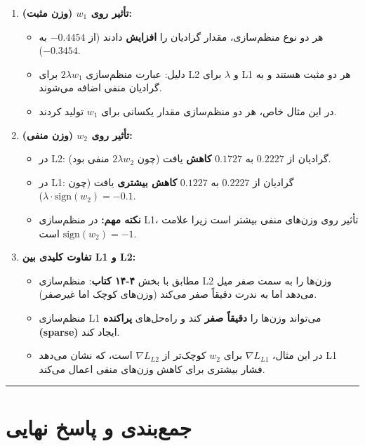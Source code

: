 \documentclass[11pt,a4paper]{article}
\newcommand{\en}[1]{\textenglish{#1}}
\newcommand{\separator}{\vspace{1em}\noindent\rule{\linewidth}{0.4pt}\vspace{1em}}
\begin{document}
\begin{enumerate}
    \item \textbf{تأثیر روی \(w_1\) (وزن مثبت):}
    \begin{itemize}
        \item هر دو نوع منظم‌سازی، مقدار گرادیان را \textbf{افزایش} دادند (از \(-0.4454\) به \(-0.3454\)).
        \item دلیل: عبارت منظم‌سازی \(2\lambda w_1\) برای \en{L2} و \(\lambda\) برای \en{L1} هر دو مثبت هستند و به گرادیان منفی اضافه می‌شوند.
        \item در این مثال خاص، هر دو منظم‌سازی مقدار یکسانی برای \(w_1\) تولید کردند.
    \end{itemize}
    
    \item \textbf{تأثیر روی \(w_2\) (وزن منفی):}
    \begin{itemize}
        \item در \en{L2}: گرادیان از \(0.2227\) به \(0.1727\) \textbf{کاهش} یافت (چون \(2\lambda w_2\) منفی بود).
        \item در \en{L1}: گرادیان از \(0.2227\) به \(0.1227\) \textbf{کاهش بیشتری} یافت (چون \(\lambda \cdot \text{sign}(w_2) = -0.1\)).
        \item \textbf{نکته مهم:} در منظم‌سازی \en{L1}، تأثیر روی وزن‌های منفی بیشتر است زیرا علامت \(\text{sign}(w_2) = -1\) است.
    \end{itemize}
    
    \item \textbf{تفاوت کلیدی بین \en{L1} و \en{L2}:}
    \begin{itemize}
        \item مطابق با بخش \textbf{\en{۴-۱۴} کتاب}: منظم‌سازی \en{L2} وزن‌ها را به سمت صفر میل می‌دهد اما به ندرت دقیقاً صفر می‌کند (وزن‌های کوچک اما غیرصفر).
        \item منظم‌سازی \en{L1} می‌تواند وزن‌ها را \textbf{دقیقاً صفر} کند و راه‌حل‌های \textbf{پراکنده (\en{sparse})} ایجاد کند.
        \item در این مثال، \(\nabla L_{L1}\) برای \(w_2\) کوچک‌تر از \(\nabla L_{L2}\) است، که نشان می‌دهد \en{L1} فشار بیشتری برای کاهش وزن‌های منفی اعمال می‌کند.
    \end{itemize}
\end{enumerate}

\separator
\section{جمع‌بندی و پاسخ نهایی}
\end{document}
